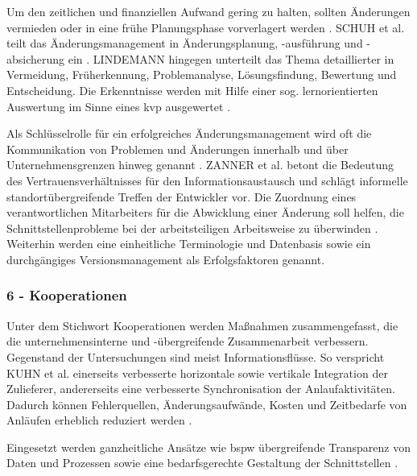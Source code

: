 Um den zeitlichen und finanziellen Aufwand gering zu halten, sollten Änderungen vermieden oder in eine frühe Planungsphase vorverlagert werden \autocite{Schuh2008, Jania2004, Ass98}. 
SCHUH et al. teilt das Änderungsmanagement in Änderungsplanung, -ausführung und -absicherung ein \autocite[217]{Schuh2008}. 
LINDEMANN hingegen unterteilt das Thema detaillierter in Vermeidung, Früherkennung, Problemanalyse, Lösungsfindung, Bewertung und Entscheidung. Die Erkenntnisse werden mit Hilfe einer sog. lernorientierten Auswertung im Sinne eines \gls{kvp} ausgewertet \autocite{Lindemann1998}. 

Als Schlüsselrolle für ein erfolgreiches Änderungsmanagement wird oft die Kommunikation von Problemen und Änderungen innerhalb und über Unternehmensgrenzen hinweg genannt \autocite{Kuhn2002, Schuh2008}.
ZANNER et al. betont die Bedeutung des Vertrauensverhältnisses für den Informationsaustausch und schlägt informelle standortübergreifende Treffen der Entwickler vor. Die Zuordnung eines verantwortlichen Mitarbeiters für die Abwicklung einer Änderung soll helfen, die Schnittstellenprobleme bei der arbeitsteiligen Arbeitsweise zu überwinden  \autocite[42]{Zanner2002}.
Weiterhin werden eine einheitliche Terminologie \autocite{Zanner2002} und Datenbasis sowie ein durchgängiges Versionsmanagement \autocite{Kuhn2002} als Erfolgsfaktoren genannt. 
\subsubsection*{6 - Kooperationen}
Unter dem Stichwort Kooperationen werden Maßnahmen zusammengefasst, die die unternehmensinterne und -übergreifende Zusammenarbeit verbessern. Gegenstand der Untersuchungen sind meist Informationsflüsse. 
So verspricht KUHN et al. einerseits verbesserte horizontale sowie vertikale Integration der Zulieferer, andererseits eine verbesserte Synchronisation der Anlaufaktivitäten. Dadurch können Fehlerquellen, Änderungsaufwände, Kosten und Zeitbedarfe von Anläufen erheblich reduziert werden \autocite[26]{Kuhn2002}. 

Eingesetzt werden ganzheitliche Ansätze wie \gls{bspw} übergreifende Transparenz von Daten und Prozessen sowie eine bedarfsgerechte Gestaltung der Schnittstellen \autocite{Kuhn2002}. 

